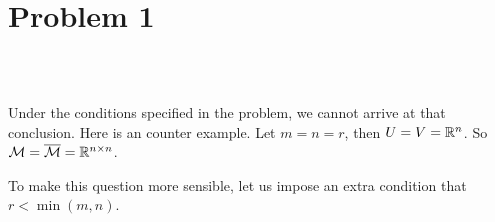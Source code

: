\section{Problem 1}~\label{sec:prob1}

\subsection{} %

Under the conditions specified in the problem,
we cannot arrive at that conclusion.
Here is an counter example.
Let $m=n=r$, then $U=V={\mathbb{R}}^n$.
So ${\mathcal{M}}={\overline{{\mathcal{M}}}}={\mathbb{R}}^{n\times n}$.

To make this question more sensible,
let us impose an extra condition that
$r<\min(m,n)$.
